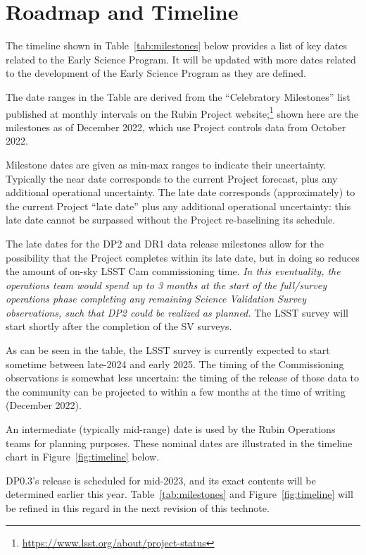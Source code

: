 \section{Roadmap and Timeline} \label{sec:timeline}

The timeline shown in Table~\ref{tab:milestones} below provides a list of key dates related to the Early Science Program.
It will be updated with more dates related to the development of the Early Science Program as they are defined.

The date ranges in the Table are derived from the ``Celebratory Milestones'' list published at monthly intervals on the Rubin Project website;\footnote{\url{https://www.lsst.org/about/project-status}} shown here are the milestones as of December 2022, which use Project controls data from October 2022.

Milestone dates are given as min-max ranges to indicate their uncertainty.
Typically the near date corresponds to the current Project forecast, plus any additional operational uncertainty.
The late date corresponds (approximately) to the current Project ``late date'' plus any additional operational uncertainty: this late date cannot be surpassed without the Project re-baselining its schedule.

The late dates for the DP2 and DR1 data release milestones allow for the possibility that the Project completes within its late date, but in doing so reduces the amount of on-sky LSST Cam commissioning time.
{\it In this eventuality, the operations team would spend up to 3 months at the start of the full/survey operations phase completing any remaining Science Validation Survey observations, such that DP2 could be realized as planned.}
The LSST survey will start shortly after the completion of the SV surveys.

As can be seen in the table, the LSST survey is currently expected to start sometime between late-2024 and early 2025.
The timing of the Commissioning observations is somewhat less uncertain: the timing of the release of those data to the community can be projected to within a few months at the time of writing (December 2022).

An intermediate (typically mid-range) date is used by the Rubin Operations teams for planning purposes. These nominal dates are illustrated in the timeline chart in Figure~\ref{fig:timeline} below.

DP0.3's release is scheduled for mid-2023, and its exact contents will be determined earlier this year.
Table~\ref{tab:milestones} and Figure~\ref{fig:timeline} will be refined in this regard in the next revision of this technote.

